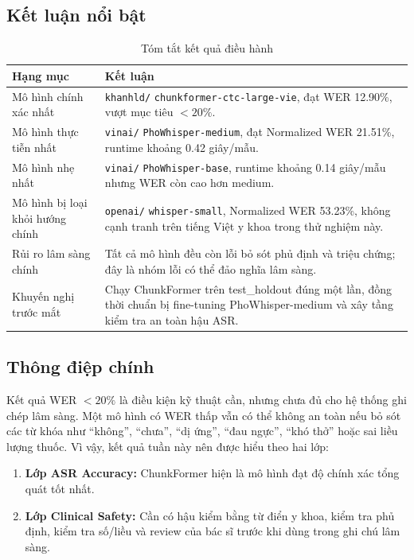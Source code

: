 \documentclass[12pt,a4paper]{article}
\begin{document}
\subsection{Kết luận nổi bật}

\begin{table}[h]
\centering
\caption{Tóm tắt kết quả điều hành}
\begin{tabularx}{\textwidth}{|l|X|}
\hline
\textbf{Hạng mục} & \textbf{Kết luận} \\
\hline
Mô hình chính xác nhất & \texttt{khanhld/} \newline \texttt{chunkformer-ctc-large-vie}, đạt WER 12.90\%, vượt mục tiêu $<20\%$. \\
\hline
Mô hình thực tiễn nhất & \texttt{vinai/} \newline \texttt{PhoWhisper-medium}, đạt Normalized WER 21.51\%, runtime khoảng 0.42 giây/mẫu. \\
\hline
Mô hình nhẹ nhất & \texttt{vinai/} \newline \texttt{PhoWhisper-base}, runtime khoảng 0.14 giây/mẫu nhưng WER còn cao hơn medium. \\
\hline
Mô hình bị loại khỏi hướng chính & \texttt{openai/} \newline \texttt{whisper-small}, Normalized WER 53.23\%, không cạnh tranh trên tiếng Việt y khoa trong thử nghiệm này. \\
\hline
Rủi ro lâm sàng chính & Tất cả mô hình đều còn lỗi bỏ sót phủ định và triệu chứng; đây là nhóm lỗi có thể đảo nghĩa lâm sàng. \\
\hline
Khuyến nghị trước mắt & Chạy ChunkFormer trên test\_holdout đúng một lần, đồng thời chuẩn bị fine-tuning PhoWhisper-medium và xây tầng kiểm tra an toàn hậu ASR. \\
\hline
\end{tabularx}
\end{table}

\subsection{Thông điệp chính}

Kết quả WER $<20\%$ là điều kiện kỹ thuật cần, nhưng chưa đủ cho hệ thống ghi chép lâm sàng. Một mô hình có WER thấp vẫn có thể không an toàn nếu bỏ sót các từ khóa như ``không'', ``chưa'', ``dị ứng'', ``đau ngực'', ``khó thở'' hoặc sai liều lượng thuốc. Vì vậy, kết quả tuần này nên được hiểu theo hai lớp:
\begin{enumerate}[leftmargin=1.2cm]
    \item \textbf{Lớp ASR Accuracy:} ChunkFormer hiện là mô hình đạt độ chính xác tổng quát tốt nhất.
    \item \textbf{Lớp Clinical Safety:} Cần có hậu kiểm bằng từ điển y khoa, kiểm tra phủ định, kiểm tra số/liều và review của bác sĩ trước khi dùng trong ghi chú lâm sàng.
\end{enumerate}
\end{document}
